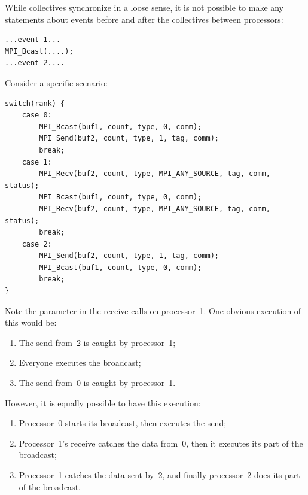 While collectives synchronize in a loose sense, it is not possible to
make any statements about events before and after the collectives
between processors:
\begin{verbatim}
...event 1...
MPI_Bcast(....);
...event 2....
\end{verbatim}
Consider a specific scenario:
\begin{verbatim}
switch(rank) { 
    case 0: 
        MPI_Bcast(buf1, count, type, 0, comm); 
        MPI_Send(buf2, count, type, 1, tag, comm); 
        break; 
    case 1: 
        MPI_Recv(buf2, count, type, MPI_ANY_SOURCE, tag, comm, status); 
        MPI_Bcast(buf1, count, type, 0, comm); 
        MPI_Recv(buf2, count, type, MPI_ANY_SOURCE, tag, comm, status); 
        break; 
    case 2: 
        MPI_Send(buf2, count, type, 1, tag, comm); 
        MPI_Bcast(buf1, count, type, 0, comm); 
        break; 
}
\end{verbatim}
Note the  parameter in the receive calls on processor~1.
One obvious execution of this would be:
\begin{enumerate}
\item The send from~2 is caught by processor~1;
\item Everyone executes the broadcast;
\item The send from~0 is caught by processor~1.
\end{enumerate}
However, it is equally possible to have this execution:
\begin{enumerate}
\item Processor~0 starts its broadcast, then executes the send;
\item Processor~1's receive catches the data from~0, then it executes
  its part of the broadcast;
\item Processor~1 catches the data sent by~2, and finally processor~2
  does its part of the broadcast.
\end{enumerate}


